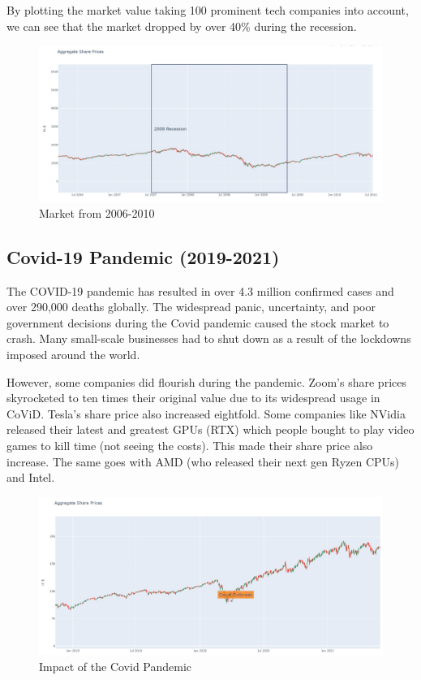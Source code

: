 \documentclass[11pt, twocolumn]{article}
\begin{document}
\begin{justify}
By plotting the market value taking 100 prominent tech companies into account, we can see that the market dropped by over
40\% during the recession.

\vspace{-5pt}
\begin{figure}[h]
  \centering
  \includegraphics[scale=0.24]{figs/rec.jpg}
  \caption*{Market from 2006-2010}
\end{figure}

\subsection{Covid-19 Pandemic (2019-2021)}
The COVID-19 pandemic has resulted in over 4.3 million confirmed cases and over 290,000 deaths globally.
The widespread panic, uncertainty, and poor government decisions during the Covid pandemic caused the stock market to crash.
Many small-scale businesses had to shut down as a result of the lockdowns imposed around the world.
\vspace{1em}


However, some companies did flourish during the pandemic. Zoom's share prices skyrocketed to ten times their original value due to its widespread usage in CoViD.
Tesla's share price also increased eightfold. Some companies like NVidia released their latest and greatest GPUs (RTX) which people bought to play video games to
kill time (not seeing the costs). This made their share price also increase. The same goes with AMD (who released their next gen Ryzen CPUs) and Intel.

\vspace{-5pt}
\begin{figure}[h]
  \centering
  \includegraphics[scale=0.24]{figs/covid.jpg}
  \caption*{Impact of the Covid Pandemic}
\end{figure}



\end{justify}
\end{document}
